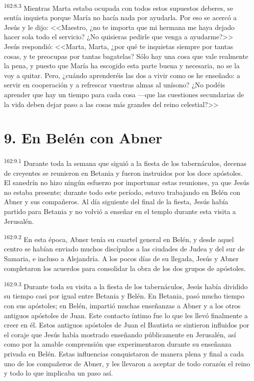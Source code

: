 \par 
\textsuperscript{162:8.3} Mientras Marta estaba ocupada con todos estos supuestos deberes, se sentía inquieta porque María no hacía nada por ayudarla. Por eso se acercó a Jesús y le dijo: <<Maestro, ¿no te importa que mi hermana me haya dejado hacer sola todo el servicio? ¿No quisieras pedirle que venga a ayudarme?>> Jesús respondió: <<Marta, Marta, ¿por qué te inquietas siempre por tantas cosas, y te preocupas por tantas bagatelas? Sólo hay una cosa que vale realmente la pena, y puesto que María ha escogido esta parte buena y necesaria, no se la voy a quitar. Pero, ¿cuándo aprenderéis las dos a vivir como os he enseñado: a servir en cooperación y a refrescar vuestras almas al unísono? ¿No podéis aprender que hay un tiempo para cada cosa ---que las cuestiones secundarias de la vida deben dejar paso a las cosas más grandes del reino celestial?>>

\section*{9. En Belén con Abner}
\par 
\textsuperscript{162:9.1} Durante toda la semana que siguió a la fiesta de los tabernáculos, decenas de creyentes se reunieron en Betania y fueron instruidos por los doce apóstoles. El sanedrín no hizo ningún esfuerzo por importunar estas reuniones, ya que Jesús no estaba presente; durante todo este período, estuvo trabajando en Belén con Abner y sus compañeros. Al día siguiente del final de la fiesta, Jesús había partido para Betania y no volvió a enseñar en el templo durante esta visita a Jerusalén.

\par 
\textsuperscript{162:9.2} En esta época, Abner tenía su cuartel general en Belén, y desde aquel centro se habían enviado muchos discípulos a las ciudades de Judea y del sur de Samaria, e incluso a Alejandría. A los pocos días de su llegada, Jesús y Abner completaron los acuerdos para consolidar la obra de los dos grupos de apóstoles.

\par 
\textsuperscript{162:9.3} Durante toda su visita a la fiesta de los tabernáculos, Jesús había dividido su tiempo casi por igual entre Betania y Belén. En Betania, pasó mucho tiempo con sus apóstoles; en Belén, impartió muchas enseñanzas a Abner y a los otros antiguos apóstoles de Juan. Este contacto íntimo fue lo que les llevó finalmente a creer en él. Estos antiguos apóstoles de Juan el Bautista se sintieron influidos por el coraje que Jesús había mostrado enseñando públicamente en Jerusalén, así como por la amable comprensión que experimentaron durante su enseñanza privada en Belén. Estas influencias conquistaron de manera plena y final a cada uno de los compañeros de Abner, y les llevaron a aceptar de todo corazón el reino y todo lo que implicaba un paso así.

